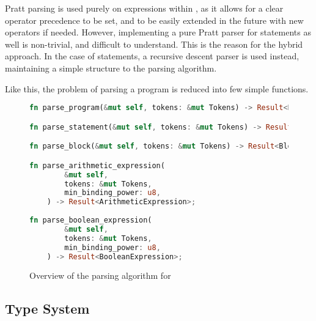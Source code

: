 Pratt parsing is used purely on expressions within \rimplang, as it allows for a clear operator precedence to be set, and to be easily extended in the future with new operators if needed. However, implementing a pure Pratt parser for statements as well is non-trivial, and difficult to understand. This is the reason for the hybrid approach. In the case of statements, a recursive descent parser is used instead, maintaining a simple structure to the parsing algorithm.

Like this, the problem of parsing a \rimplang program is reduced into few simple functions.

\begin{figure}[h]
    \centering
    \begin{lstlisting}[language=rust,label={lst:parser}, basicstyle=\small]
fn parse_program(&mut self, tokens: &mut Tokens) -> Result<Program>;

fn parse_statement(&mut self, tokens: &mut Tokens) -> Result<Statement>;

fn parse_block(&mut self, tokens: &mut Tokens) -> Result<Block>;

fn parse_arithmetic_expression(
        &mut self,
        tokens: &mut Tokens,
        min_binding_power: u8,
    ) -> Result<ArithmeticExpression>;
    
fn parse_boolean_expression(
        &mut self,
        tokens: &mut Tokens,
        min_binding_power: u8,
    ) -> Result<BooleanExpression>;
    \end{lstlisting}
    \caption{Overview of the parsing algorithm for \rimp}
    \label{fig:parser}
\end{figure}

\subsection{Type System}




